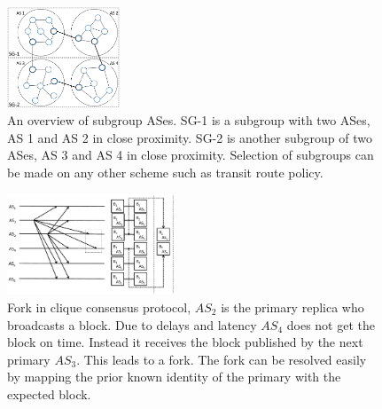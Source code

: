\documentclass[5p]{elsarticle}
\begin{document}
\begin{figure}[t]
\begin{center}
\includegraphics[width=0.30\textwidth]{fig/ASes_SG.pdf}
\caption{An overview of subgroup ASes. SG-1 is a subgroup with two ASes, AS 1 and AS 2 in close proximity. SG-2 is another subgroup of two ASes, AS 3 and AS 4 in close proximity. Selection of subgroups can be made on any other scheme such as transit route policy.} 
\label{fig:ASes_SG}
\end{center}
\end{figure}

\begin{figure}[t]
\begin{center}
\includegraphics[width=0.45\textwidth]{fig/bgp_clique.pdf}
\caption{Fork in clique consensus protocol, $AS_2$ is the primary replica who broadcasts a block. Due to delays and latency  $AS_4$ does not get the block on time. Instead it receives the block published by the next primary $AS_3$. This leads to a fork. The fork can be resolved easily by mapping the prior known identity of the primary with the expected block. } 
\label{fig:Clique_fork}
\end{center}
\end{figure}

\end{document}
